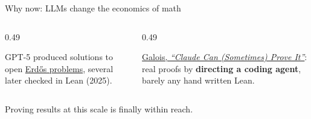 \documentclass[aspectratio=169, 11pt, t]{beamer}
\newcommand{\acc}[1]{{\color{miaccent}#1}}          %
\newcommand{\pop}[1]{{\color{misharp}\textbf{#1}}}
\begin{document}
\begin{frame}{Why now: LLMs change the economics of math}
  \begin{columns}[T]
    \begin{column}{0.49\textwidth}
      \begin{card}[title=LLMs can do real math, equal height group=whynow]
        GPT-5 produced solutions to open \href{https://openai.com/index/accelerating-science-gpt-5/}{Erd\H{o}s problems}, several later checked in Lean (2025).
      \end{card}
    \end{column}
    \begin{column}{0.49\textwidth}
      \begin{card}[title=LLMs can write Lean, equal height group=whynow]
        \href{https://www.galois.com/articles/claude-can-sometimes-prove-it}{Galois, \emph{``Claude Can (Sometimes) Prove It''}}: real proofs by \pop{directing a coding agent}, barely any hand written Lean.
      \end{card}
    \end{column}
  \end{columns}
  \vspace{0.45cm}
  \begin{callout}
    Proving results at this scale is finally \acc{within reach}.
  \end{callout}
\end{frame}
\end{document}
